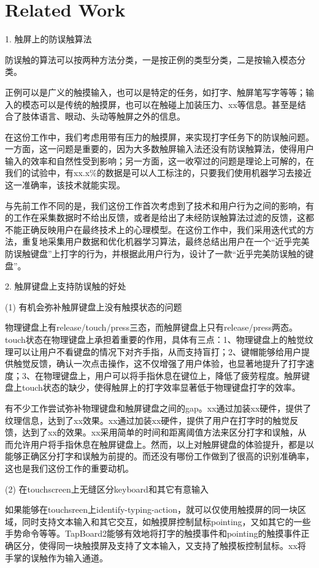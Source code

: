 \section{Related Work}

1. 触屏上的防误触算法

防误触的算法可以按两种方法分类，一是按正例的类型分类，二是按输入模态分类。

正例可以是广义的触摸输入，也可以是特定的任务，如打字、触屏笔写字等等；输入的模态可以是传统的触摸屏，也可以在触碰上加装压力、xx等信息。甚至是结合了肢体语言、眼动、头动等触屏之外的信息。

在这份工作中，我们考虑用带有压力的触摸屏，来实现打字任务下的防误触问题。一方面，这一问题是重要的，因为大多数触屏输入法还没有防误触算法，使得用户输入的效率和自然性受到影响；另一方面，这一收窄过的问题是理论上可解的，在我们的试验中，有xx.x\%的数据是可以人工标注的，只要我们使用机器学习去接近这一准确率，该技术就能实现。

与先前工作不同的是，我们这份工作首次考虑到了技术和用户行为之间的影响，有的工作在采集数据时不给出反馈，或者是给出了未经防误触算法过滤的反馈，这都不能正确反映用户在最终技术上的心理模型。在这份工作中，我们采用迭代式的方法，重复地采集用户数据和优化机器学习算法，最终总结出用户在一个“近乎完美防误触键盘”上打字的行为，并根据此用户行为，设计了一款“近乎完美防误触的键盘”。

2. 触屏键盘上支持防误触的好处

(1) 有机会弥补触屏键盘上没有触摸状态的问题

物理键盘上有release/touch/press三态，而触屏键盘上只有release/press两态。touch状态在物理键盘上承担着重要的作用，具体有三点：1、物理键盘上的触觉纹理可以让用户不看键盘的情况下对齐手指，从而支持盲打；2、键帽能够给用户提供触觉反馈，确认一次点击操作，这不仅增强了用户体验，也显著地提升了打字速度；3、在物理键盘上，用户可以将手指休息在键位上，降低了疲劳程度。触屏键盘上touch状态的缺少，使得触屏上的打字效率显著低于物理键盘打字的效率。

有不少工作尝试弥补物理键盘和触屏键盘之间的gap。xx通过加装xx硬件，提供了纹理信息，达到了xx效果。xx通过加装xx硬件，提供了用户在打字时的触觉反馈，达到了xx的效果。xx采用简单的时间和距离阈值方法来区分打字和误触，从而允许用户将手指休息在触屏键盘上。然而，以上对触屏键盘的体验提升，都是以能够正确区分打字和误触为前提的。而还没有哪份工作做到了很高的识别准确率，这也是我们这份工作的重要动机。

(2) 在touchscreen上无缝区分keyboard和其它有意输入

如果能够在touchsreen上identify-typing-action，就可以仅使用触摸屏的同一块区域，同时支持文本输入和其它交互，如触摸屏控制鼠标pointing，又如其它的一些手势命令等等。TapBoard2能够有效地将打字的触摸事件和pointing的触摸事件正确区分，使得同一块触摸屏及支持了文本输入，又支持了触摸板控制鼠标。xx将手掌的误触作为输入通道。

